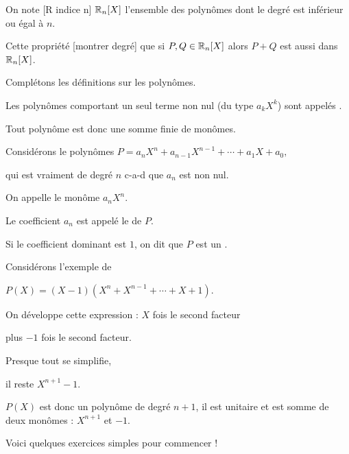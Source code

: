 \change

On note [R indice n] $\mathbb{R}_n[X]$ l'ensemble des polynômes dont le degré est inférieur
ou égal à $n$.

Cette propriété [montrer degré] que 
si $P,Q \in \mathbb{R}_n[X]$ alors $P+Q$ est aussi dans  $\mathbb{R}_n[X]$.






\diapo

Complétons les définitions sur les polynômes.

 Les polynômes comportant un seul terme non nul (du type $a_kX^k$) sont
appelés .

Tout polynôme est donc une somme finie de monômes. 

\change
Considérons le polynômes $P=a_nX^n+a_{n-1}X^{n-1}+\cdots + a_1X+a_0,$ 

qui est vraiment de degré $n$ c-a-d que $a_n$ est non nul.

\change

On appelle  le monôme $a_nX^n$. 

\change

Le coefficient $a_n$ est appelé le  de $P$. 

\change

Si le coefficient dominant est $1$, on dit que $P$ est un .

\change

Considérons l'exemple de 

$P(X)=(X-1)(X^n+X^{n-1}+\cdots + X+1)$.

\change

On développe cette expression :
$X$ fois le second facteur

plus
$-1$ fois le second facteur.

Presque tout se simplifie,

il reste $X^{n+1} - 1$.

\change

$P(X)$ est donc un polynôme de degré $n+1$, il est unitaire et 
est somme de deux monômes : $X^{n+1}$ et $-1$.


\diapo


Voici quelques exercices simples pour commencer !




